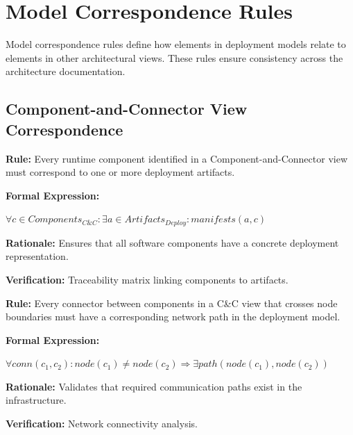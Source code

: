 \documentclass[11pt,letterpaper]{article}
\begin{document}
\section{Model Correspondence Rules}

Model correspondence rules define how elements in deployment models relate to elements in other architectural views. These rules ensure consistency across the architecture documentation.

\subsection{Component-and-Connector View Correspondence}

\begin{definitionbox}
\textbf{Rule:} Every runtime component identified in a Component-and-Connector view must correspond to one or more deployment artifacts.

\textbf{Formal Expression:}
\begin{center}
$\forall c \in Components_{C\&C} : \exists a \in Artifacts_{Deploy} : manifests(a, c)$
\end{center}

\textbf{Rationale:} Ensures that all software components have a concrete deployment representation.

\textbf{Verification:} Traceability matrix linking components to artifacts.
\end{definitionbox}

\begin{definitionbox}
\textbf{Rule:} Every connector between components in a C\&C view that crosses node boundaries must have a corresponding network path in the deployment model.

\textbf{Formal Expression:}
\begin{center}
$\forall conn(c_1, c_2) : node(c_1) \neq node(c_2) \Rightarrow \exists path(node(c_1), node(c_2))$
\end{center}

\textbf{Rationale:} Validates that required communication paths exist in the infrastructure.

\textbf{Verification:} Network connectivity analysis.
\end{definitionbox}
\end{document}
